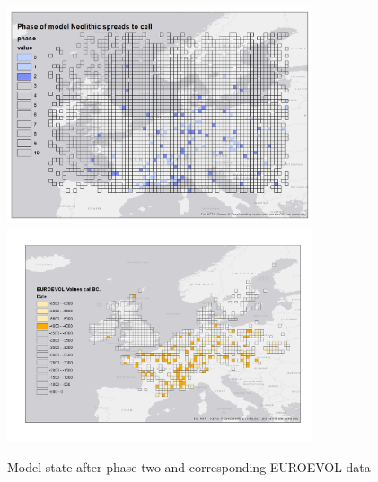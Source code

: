 \begin{figure}
\centering
	\includegraphics[width=0.8\textwidth]{figures/model-2}
	\includegraphics[width=0.8\textwidth]{figures/euroevol-2}
  \caption{Model state after phase two and corresponding EUROEVOL data}
  \label{fig:compare2}
\end{figure}

